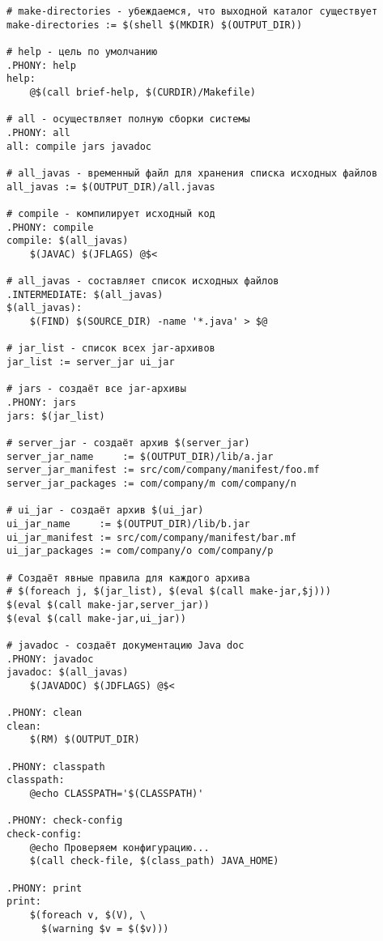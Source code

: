 {\begin{verbatim}
# make-directories - убеждаемся, что выходной каталог существует
make-directories := $(shell $(MKDIR) $(OUTPUT_DIR))

# help - цель по умолчанию
.PHONY: help
help:
    @$(call brief-help, $(CURDIR)/Makefile)

# all - осуществляет полную сборки системы
.PHONY: all
all: compile jars javadoc

# all_javas - временный файл для хранения списка исходных файлов
all_javas := $(OUTPUT_DIR)/all.javas

# compile - компилирует исходный код
.PHONY: compile
compile: $(all_javas)
    $(JAVAC) $(JFLAGS) @$<

# all_javas - составляет список исходных файлов
.INTERMEDIATE: $(all_javas)
$(all_javas):
    $(FIND) $(SOURCE_DIR) -name '*.java' > $@

# jar_list - список всех jar-архивов
jar_list := server_jar ui_jar

# jars - создаёт все jar-архивы
.PHONY: jars
jars: $(jar_list)

# server_jar - создаёт архив $(server_jar)
server_jar_name     := $(OUTPUT_DIR)/lib/a.jar
server_jar_manifest := src/com/company/manifest/foo.mf
server_jar_packages := com/company/m com/company/n

# ui_jar - создаёт архив $(ui_jar)
ui_jar_name     := $(OUTPUT_DIR)/lib/b.jar
ui_jar_manifest := src/com/company/manifest/bar.mf
ui_jar_packages := com/company/o com/company/p

# Создаёт явные правила для каждого архива
# $(foreach j, $(jar_list), $(eval $(call make-jar,$j)))
$(eval $(call make-jar,server_jar))
$(eval $(call make-jar,ui_jar))

# javadoc - создаёт документацию Java doc
.PHONY: javadoc
javadoc: $(all_javas)
    $(JAVADOC) $(JDFLAGS) @$<

.PHONY: clean
clean:
    $(RM) $(OUTPUT_DIR)

.PHONY: classpath
classpath:
    @echo CLASSPATH='$(CLASSPATH)'

.PHONY: check-config
check-config:
    @echo Проверяем конфигурацию...
    $(call check-file, $(class_path) JAVA_HOME)

.PHONY: print
print:
    $(foreach v, $(V), \
      $(warning $v = $($v)))
\end{verbatim}
}
